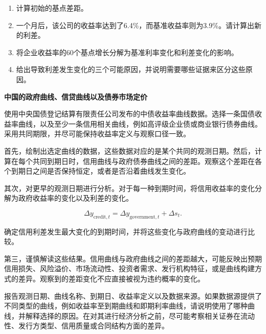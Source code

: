 \begin{enumerate}
\begin{enumerate}
\item 计算初始的基点差距。

\item 一个月后，该公司的收益率达到了6.4\%，而基准收益率则为3.9\%。请计算出新的利差。

\item 将企业收益率的60个基点增长分解为基准利率变化和利差变化的影响。

\item 给出导致利差发生变化的三个可能原因，并说明需要哪些证据来区分这些原因。

\end{enumerate}

\end{enumerate}



\textbf{中国的政府曲线、信贷曲线以及债券市场定价}

使用中央国债登记结算有限责任公司发布的中债收益率曲线数据。选择一条国债收益率曲线，以及至少一条信用相关曲线，例如高评级企业债或商业银行债券曲线。采用共同期限，并尽可能保持收益率定义与观察口径一致。

首先，绘制出选定曲线的数据，这些数据对应的是某个共同的观测日期。然后，计算在每个共同到期日时，信用曲线与政府债券曲线之间的差距。观察这个差距在各个到期日之间是否保持恒定，或者是否沿着曲线发生变化。

其次，对更早的观测日期进行分析。对于每一种到期时间，将信用收益率的变化分解为政府收益率的变化以及利差的变化。

\[
\Delta y_{\mathrm{credit},t}
=
\Delta y_{\mathrm{government},t}
+
\Delta s_t.
\]

确定信用利差发生最大变化的到期时间，并将这些变化与政府曲线的变动进行比较。

第三，谨慎解读这些结果。信用曲线与政府曲线之间的差距越大，可能反映出预期信用损失、风险溢价、市场流动性、投资者需求、发行机构特征，或是曲线构建方式的差异。观察到的差距变化不应直接被视为违约概率的变化。

报告观测日期、曲线名称、到期日、收益率定义以及数据来源。如果数据源提供了不同类型的曲线，例如收益率至到期曲线和即期利率曲线，请说明使用了哪种曲线，并解释选择的原因。在对其进行经济分析之前，尽可能考察相关证券在流动性、发行方类型、信用质量或合同结构方面的差异。


